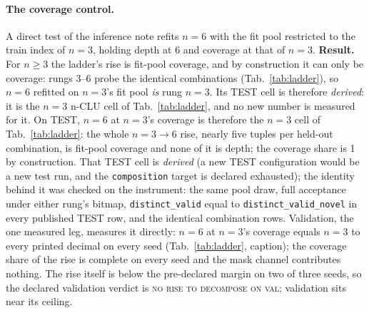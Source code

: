 \documentclass{article} %
\begin{document}
\paragraph{The coverage control.} A direct test of the inference note refits $n=6$ with the
fit pool restricted to the train index of $n=3$, holding depth at 6 and coverage at that of $n=3$.
\textbf{Result.} For $n\ge3$ the ladder's rise is fit-pool
coverage, and by construction it can only be coverage: rungs 3--6 probe the identical combinations (Tab.~\ref{tab:ladder}), %
so $n=6$ refitted on $n=3$'s fit pool \emph{is} rung $n=3$. Its TEST cell is therefore
\emph{derived}: it is the $n=3$ n-CLU cell of Tab.~\ref{tab:ladder}, and no new
number is measured for it. %
On TEST, $n=6$ at $n=3$'s coverage is therefore the $n=3$ cell of Tab.~\ref{tab:ladder}: %
the whole $n=3\to6$ rise, nearly five tuples per held-out combination, is fit-pool coverage and %
none of it is depth; the coverage share is 1 by construction. That TEST cell is \emph{derived} (a new TEST configuration would be a new test run, and the \texttt{composition} target is
declared exhausted); the identity behind it was checked on the instrument: the same pool draw,
full acceptance under either rung's bitmap, \texttt{distinct\_valid} equal to %
\texttt{distinct\_valid\_novel} in every published TEST row, and the identical %
combination rows. Validation, the one measured leg, measures it %
directly: $n=6$ at $n=3$'s coverage equals $n=3$ to every printed decimal on every seed %
(Tab.~\ref{tab:ladder}, caption); the coverage %
share of the rise is complete on every seed and the mask channel contributes nothing. The rise itself %
is below the pre-declared margin on two of three seeds, so the %
declared validation verdict is \textsc{no rise to decompose on val}; validation sits near its ceiling. %
\end{document}
